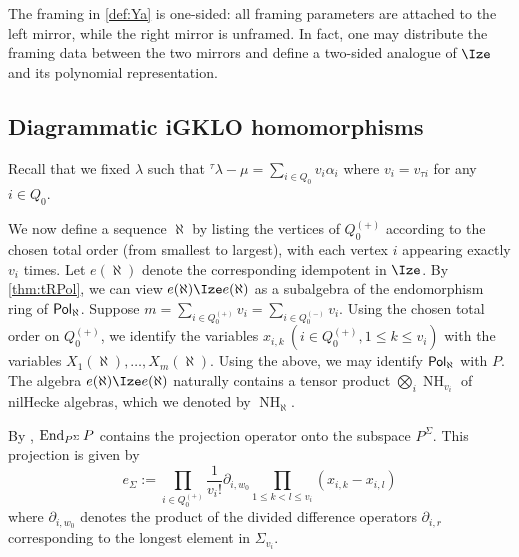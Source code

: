 \begin{remark}
    The framing in \cref{def:Ya} is one-sided: all framing parameters are attached to the left mirror, while the right mirror is unframed. In fact, one may distribute the framing data between the two mirrors and define a two-sided analogue of $\tR$ and its polynomial representation.
\end{remark}


\subsection{Diagrammatic iGKLO homomorphisms}
\label{sec:diagiGKLO}
Recall that we fixed $\lambda$ such that ${}^\tau\lambda-\mu=\sum_{i\in Q_0}v_i\alpha_i$ where $v_i=v_{\tau i}$ for any $i\in Q_0$. 

\newcommand{\NH}{\operatorname{NH}_\aleph}

We now define a sequence $\aleph$ by listing the vertices of $Q_0^{(+)}$ according to the chosen total order (from smallest to largest), with each vertex $i$ appearing exactly $v_i$ times.  
Let $e(\aleph)$ denote the corresponding idempotent in $\tR$.
By \cref{thm:tRPol}, we can view 
\(
e(\aleph)\tR e(\aleph)
\)
as a subalgebra of the endomorphism ring of $\mathsf{Pol}_{\aleph}$. Suppose $m=\sum_{i\in Q_0^{(+)}}v_i=\sum_{i\in Q_0^{(-)}}v_{i}$. Using the chosen total order on $Q_0^{(+)}$, we identify the variables $x_{i,k}\ (i\in Q_0^{(+)},1\leq k \leq v_i)$ with the variables $ X_1(\aleph), \ldots, X_m(\aleph)$. Using the above, we may identify $\mathsf{Pol}_{\aleph}$ with $P$. The algebra $e(\aleph) \tR e(\aleph)$ naturally contains a tensor product $\bigotimes_i \operatorname{NH}_{v_i}$ of nilHecke algebras, which we denoted by $\NH$. 

By \cite[Prop. 4.15]{KTWWY19}, $\operatorname{End}_{P^\Sigma} P $ contains the projection operator onto the subspace $ P^\Sigma $.  This projection is given by
\begin{equation}
\label{symidempotent}
e_{\Sigma} := \prod_{i\in Q_0^{(+)}} \frac{1}{v_i !}\partial_{i, w_0} \prod_{1 \le k < l \le v_i} (x_{i,k} - x_{i,l} )
\end{equation}
where $ \partial_{i,w_0} $ denotes the product of the divided difference operators $ \partial_{i,r} $ corresponding to the longest element in $ \Sigma_{v_i} $. 

